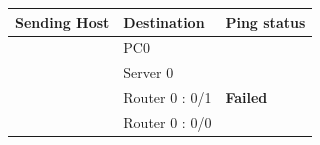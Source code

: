 \documentclass[a4paper,11pt]{article}
\begin{document}
\begin{enumerate}





          \begin{table}[H]
              \centering
              \begin{tabular}{| m{9em}| m{12em}| m{9em} |}
                  \hline
                  {\cellcolor[rgb]{0.333,0.686,1}}\textbf{Sending Host}                & \textbf{Destination} & \multicolumn{1}{l|}{\textbf{Ping status}}                                               \\
                  \hline
                  {\cellcolor[rgb]{0.333,0.686,1}}                                     & PC0                  & \multicolumn{1}{l|}{{\cellcolor[rgb]{1,0.141,0.059}}}                                   \\
                  \hhline{|>{\arrayrulecolor[rgb]{0.333,0.686,1}}->{\arrayrulecolor{black}}->{\arrayrulecolor[rgb]{1,0.141,0.059}}->{\arrayrulecolor{black}}|}
                  {\cellcolor[rgb]{0.333,0.686,1}}                                     & Server 0             & \multicolumn{1}{l|}{{\cellcolor[rgb]{1,0.141,0.059}}}                                   \\
                  \hhline{|>{\arrayrulecolor[rgb]{0.333,0.686,1}}->{\arrayrulecolor{black}}->{\arrayrulecolor[rgb]{1,0.141,0.059}}->{\arrayrulecolor{black}}|}
                  {\cellcolor[rgb]{0.333,0.686,1}}                                     & Router 0 : 0/1       & \multicolumn{1}{l|}{\multirow{-3}{*}{{\cellcolor[rgb]{1,0.141,0.059}}\textbf{Failed} }} \\
                  \hhline{|>{\arrayrulecolor[rgb]{0.333,0.686,1}}->{\arrayrulecolor{black}}--}
                  {\cellcolor[rgb]{0.333,0.686,1}}                                     & Router 0 : 0/0       & {\cellcolor[rgb]{0.376,1,0.882}}                                                        \\

\end{tabular}
\end{table}
\end{enumerate}
\end{document}
